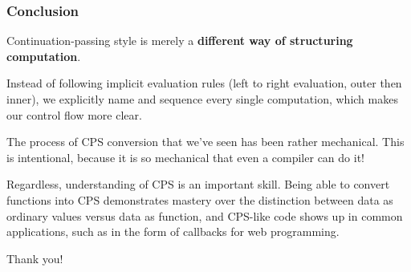 \documentclass[aspectratio=169]{beamer}
\begin{document}
\begin{frame}[fragile]
  \frametitle{Conclusion}

  Continuation-passing style is merely a \textbf{different way of structuring
  computation}.
  
  Instead of following implicit evaluation rules (left to right evaluation,
  outer then inner), we explicitly name and sequence every single computation,
  which makes our control flow more clear.

  The process of CPS conversion that we've seen has been rather mechanical. This
  is intentional, because it is so mechanical that even a compiler can do it!

  Regardless, understanding of CPS is an important skill. Being able to convert functions
  into CPS demonstrates mastery over the distinction between data as 
  ordinary values versus data as function, and CPS-like code shows up in common
  applications, such as in the form of callbacks for web programming.
\end{frame}

\begin{frame}[plain]
	\begin{center} Thank you! \end{center}
\end{frame}
\end{document}
